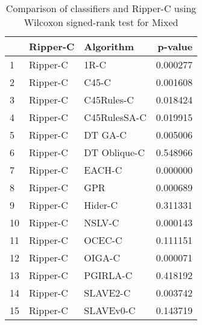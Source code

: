 \begin{table}
\footnotesize
\caption{Comparison of classifiers and Ripper-C using Wilcoxon signed-rank test for Mixed}
\label{tab:Ripper-C wilcoxon Mixed comparison}
\begin{tabular}{lllr}
\hline
 & Ripper-C & Algorithm & p-value \\
\hline
1 & Ripper-C & 1R-C & 0.000277 \\
2 & Ripper-C & C45-C & 0.001608 \\
3 & Ripper-C & C45Rules-C & 0.018424 \\
4 & Ripper-C & C45RulesSA-C & 0.019915 \\
5 & Ripper-C & DT GA-C & 0.005006 \\
6 & Ripper-C & DT Oblique-C & 0.548966 \\
7 & Ripper-C & EACH-C & 0.000000 \\
8 & Ripper-C & GPR & 0.000689 \\
9 & Ripper-C & Hider-C & 0.311331 \\
10 & Ripper-C & NSLV-C & 0.000143 \\
11 & Ripper-C & OCEC-C & 0.111151 \\
12 & Ripper-C & OIGA-C & 0.000071 \\
13 & Ripper-C & PGIRLA-C & 0.418192 \\
14 & Ripper-C & SLAVE2-C & 0.003742 \\
15 & Ripper-C & SLAVEv0-C & 0.143719 \\
\hline
\end{tabular}
\end{table}
